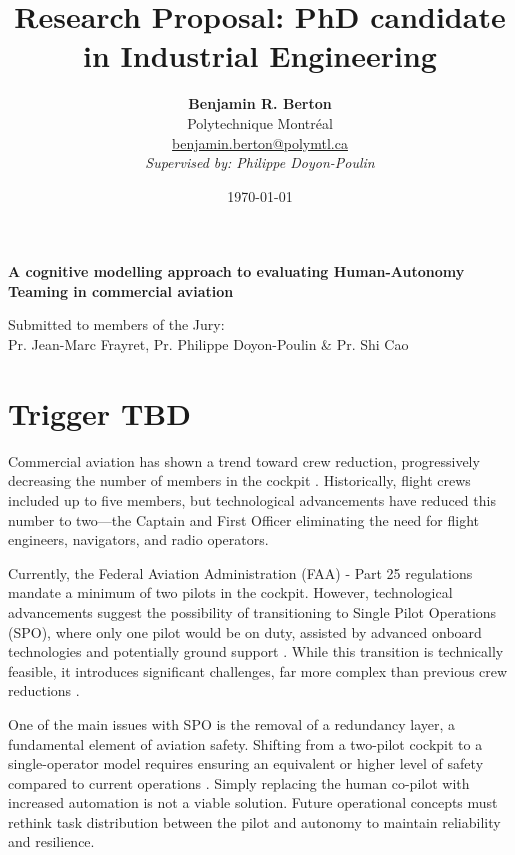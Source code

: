 \documentclass[12pt,a4paper]{article} %
\title{\textbf{Research Proposal: PhD candidate in Industrial Engineering}} %
\author{
	\textbf{Benjamin R. Berton}\\
	Polytechnique Montréal\\
	\href{mailto:benjamin.berton@polymtl.ca}{benjamin.berton@polymtl.ca}\\
	\textit{Supervised by: Philippe Doyon-Poulin}
} %
\begin{document}
	\maketitle %
	
	\begin{center}
		\textbf{A cognitive modelling approach to evaluating Human-Autonomy Teaming in commercial aviation}
	\end{center} %
	
	\begin{center}
		Submitted to members of the Jury:\\
		Pr. Jean-Marc Frayret, Pr. Philippe Doyon-Poulin \& Pr. Shi Cao\\
		\date{\today} %
	\end{center} %
	
	\newpage %
	
	\tableofcontents %
	\newpage %
	
	\section{Trigger \textbf{TBD}} %
	Commercial aviation has shown a trend toward crew reduction, progressively decreasing the number of members in the cockpit \parencite{harris_human-centred_2007}. Historically, flight crews included up to five members, but technological advancements have reduced this number to two—the Captain and First Officer eliminating the need for flight engineers, navigators, and radio operators.
	
	Currently, the Federal Aviation Administration (FAA) - Part 25 regulations mandate a minimum of two pilots in the cockpit. However, technological advancements suggest the possibility of transitioning to Single Pilot Operations (SPO), where only one pilot would be on duty, assisted by advanced onboard technologies and potentially ground support \parencite{bilimoria_conceptual_2014}. While this transition is technically feasible, it introduces significant challenges, far more complex than previous crew reductions \parencite{matessa_using_2017}.
	
	One of the main issues with SPO is the removal of a redundancy layer, a fundamental element of aviation safety. Shifting from a two-pilot cockpit to a single-operator model requires ensuring an equivalent or higher level of safety compared to current operations \parencite{boy_requirements_2014}. Simply replacing the human co-pilot with increased automation is not a viable solution. Future operational concepts must rethink task distribution between the pilot and autonomy to maintain reliability and resilience.
	
\end{document}
